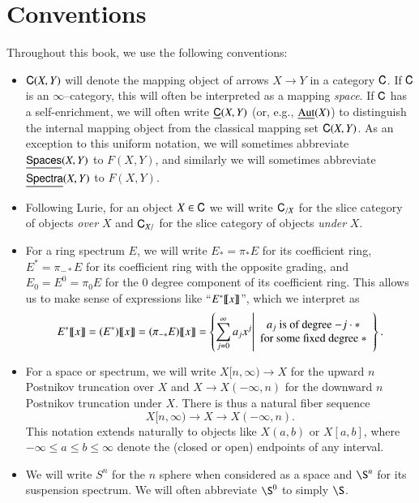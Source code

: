 
\section{Conventions}

Throughout this book, we use the following conventions:

\begin{itemize}
\item $\mathsf{C}(X, Y)$ will denote the mapping object of arrows $X \to Y$ in a category $\mathsf{C}$.  If $\mathsf{C}$ is an $\infty$--category, this will often be interpreted as a mapping \emph{space}.  If $\mathsf{C}$ has a self-enrichment, we will often write $\underline{\mathsf{C}}(X, Y)$ (or, e.g., $\operatorname{\underline{\smash{\operatorname{Aut}}}}(X)$) to distinguish the internal mapping object from the classical mapping set $\mathsf{C}(X, Y)$.  As an exception to this uniform notation, we will sometimes abbreviate $\underline{\mathsf{Spaces}}(X, Y)$ to $F(X, Y)$, and similarly we will sometimes abbreviate $\underline{\mathsf{Spectra}}(X, Y)$ to $F(X, Y)$.
\item Following Lurie, for an object $X \in \mathsf{C}$ we will write $\mathsf{C}_{/X}$ for the slice category of objects \emph{over} $X$ and $\mathsf{C}_{X/}$ for the slice category of objects \emph{under} $X$.
\item For a ring spectrum $E$, we will write $E_* = \pi_* E$ for its coefficient ring, $E^* = \pi_{-*} E$ for its coefficient ring with the opposite grading, and $E_0 = E^0 = \pi_0 E$ for the $0${\th} degree component of its coefficient ring.  This allows us to make sense of expressions like ``$E^*\llbracket{x}\rrbracket$'', which we interpret as \[E^*\llbracket{x}\rrbracket = (E^*)\llbracket{x}\rrbracket = (\pi_{-*} E)\llbracket{x}\rrbracket = \left\{ \sum_{j=0}^\infty a_j x^j \middle| \begin{array}{c} \text{$a_j$ is of degree $-j \cdot *$} \\ \text{for some fixed degree $*$} \end{array} \right\}.\]
\item For a space or spectrum, we will write $X[n, \infty) \to X$ for the upward $n${\th} Postnikov truncation over $X$ and $X \to X(-\infty, n)$ for the downward $n${\th} Postnikov truncation under $X$.  There is thus a natural fiber sequence \[X[n, \infty) \to X \to X(-\infty, n).\]  This notation extends naturally to objects like $X(a, b)$ or $X[a, b]$, where $-\infty \le a \le b \le \infty$ denote the (closed or open) endpoints of any interval.
\item We will write $S^n$ for the $n${\th} sphere when considered as a space and $\S^n$ for its suspension spectrum.  We will often abbreviate $\S^0$ to simply $\S$.
\end{itemize}

